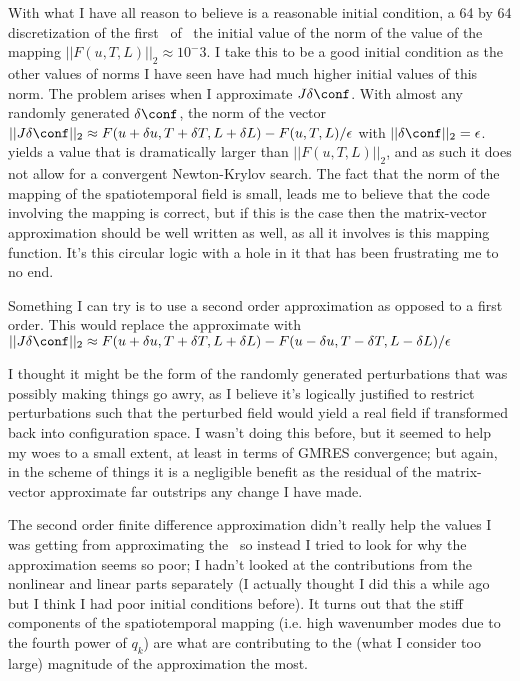 With what I have all reason to believe is a reasonable initial condition, a 64 by 64 discretization
of the first \ppo\ of \KS\ the initial value of the norm of the value of the mapping
$||F(u,T,L)||_2 \approx 10^-3$. I take this to be a good initial condition as the other values of norms
I have seen have had much higher initial values of this norm. The problem arises when I approximate
$J \delta \conf$. With almost any randomly generated $\delta \conf$, the norm of the vector $||J \delta \conf||_2
\approx F(u+\delta u, T + \delta T, L + \delta L) - F(u,T,L) / \epsilon $ with $||\delta \conf||_2 = \epsilon$.
yields a value that is dramatically larger than $||F(u,T,L)||_2$, and as such it does not allow for a convergent
Newton-Krylov search. The fact that the norm of the mapping of the spatiotemporal field is small, leads me to
believe that the code involving the mapping is correct, but if this is the case then the matrix-vector approximation
should be well written as well, as all it involves is this mapping function. It's this circular logic
with a hole in it that has been frustrating me to no end.

Something I can try is to use a second order approximation as opposed to a first order.
This would replace the approximate with $||J \delta \conf||_2
\approx F(u+\delta u, T + \delta T, L + \delta L) - F(u-\delta u,T - \delta T,L - \delta L) / \epsilon $

I thought it might be the form of the randomly generated perturbations that was possibly making things
go awry, as I believe it's logically justified to restrict perturbations such that the perturbed field would
yield a real field if transformed back into configuration space. I wasn't doing this before, but it seemed to
help my woes to a small extent, at least in terms of GMRES convergence; but again, in the scheme of things
it is a negligible benefit as the residual of the matrix-vector approximate far outstrips any change I
have made.

The second order finite difference approximation didn't really help the values I was getting from approximating
the \jacobianM\ so instead I tried to look for why the approximation seems so poor; I hadn't looked at the contributions
from the nonlinear and linear parts separately (I actually thought I did this a while ago but I think I had poor initial conditions
before). It turns out that the stiff components of the spatiotemporal mapping (i.e. high wavenumber modes due to the fourth power
of $q_k$) are what are contributing to the (what I consider too large) magnitude of the approximation the most.

